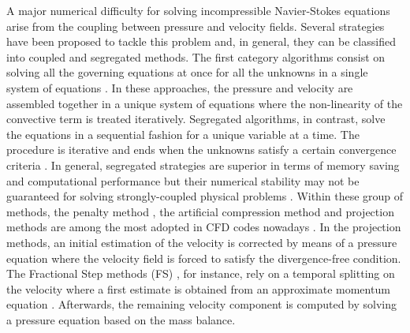 \documentclass[final,3p,times,11pt,onecolumn]{myElsarticle}
\numberwithin{equation}{section}
\begin{document}
A major numerical difficulty for solving incompressible Navier-Stokes equations arise from the coupling between pressure and velocity fields. Several strategies have been proposed to tackle this problem and, in general, they can be classified into coupled and segregated methods. The first category algorithms consist on solving all the governing equations at once for all the unknowns in a single system of equations \cite{mazhar1, mazhar2, chen, darwish1, darwish2, uroic}. In these approaches, the pressure and velocity are assembled together in a unique system of equations where the non-linearity of the convective term is treated iteratively. Segregated algorithms, in contrast, solve the equations in a sequential fashion for a unique variable at a time. The procedure is iterative and ends when the unknowns satisfy a certain convergence criteria \cite{ferziger, versteeg, moukalled}. In general, segregated strategies are superior in terms of memory saving and computational performance but their numerical stability may not be guaranteed for solving strongly-coupled physical problems \cite{uroic,wang2}. Within these group of methods, the penalty method \cite{temam1968methode}, the artificial compression method \cite{harten1977artificial} and projection methods \cite{chorin1, chorin2} are among the most adopted in CFD codes nowadays \cite{wang2}. In the projection methods, an initial estimation of the velocity is corrected by means of a pressure equation where the velocity field is forced to satisfy the divergence-free condition. The Fractional Step methods (FS) \cite{kim}, for instance, rely on a temporal splitting on the velocity where a first estimate is obtained from an approximate momentum equation%
. Afterwards, the remaining velocity component is computed by solving a pressure equation based on the mass balance.
\end{document}
